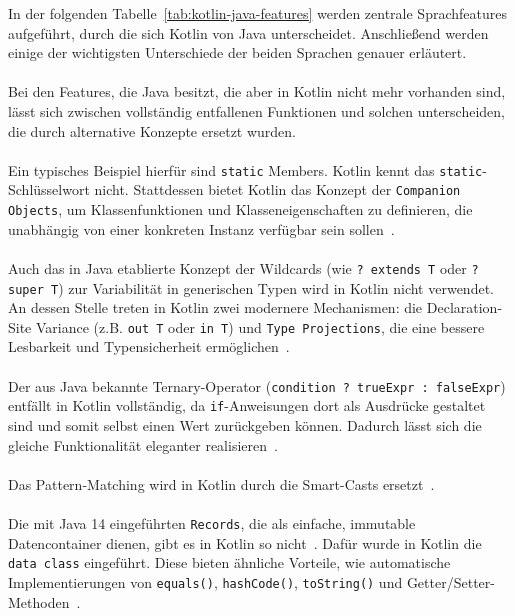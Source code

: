 \documentclass[11pt]{article}
\begin{document}
    In der folgenden Tabelle~\ref{tab:kotlin-java-features} werden zentrale Sprachfeatures aufgeführt, durch die sich Kotlin von Java unterscheidet.
    Anschließend werden einige der wichtigsten Unterschiede der beiden Sprachen genauer erläutert.\\
    \\
    Bei den Features, die Java besitzt, die aber in Kotlin nicht mehr vorhanden sind, lässt sich zwischen vollständig entfallenen Funktionen und solchen unterscheiden, die durch alternative Konzepte ersetzt wurden.\\
    \\
    Ein typisches Beispiel hierfür sind \texttt{static} Members.
    Kotlin kennt das \texttt{static}-Schlüsselwort nicht.
    Stattdessen bietet Kotlin das Konzept der \texttt{Companion Objects}, um Klassenfunktionen und Klasseneigenschaften zu definieren, die unabhängig von einer konkreten Instanz verfügbar sein sollen~\cite{kotlin-static-members}.\\
    \\
    Auch das in Java etablierte Konzept der Wildcards (wie \texttt{? extends T} oder \texttt{? super T}) zur Variabilität in generischen Typen wird in Kotlin nicht verwendet.
    An dessen Stelle treten in Kotlin zwei modernere Mechanismen: die Declaration-Site Variance (z.B. \texttt{out T} oder \texttt{in T}) und \texttt{Type Projections}, die eine bessere Lesbarkeit und Typensicherheit ermöglichen~\cite{doc-comparison}.\\
    \\
    Der aus Java bekannte Ternary-Operator (\texttt{condition ? trueExpr : falseExpr}) entfällt in Kotlin vollständig, da \texttt{if}-Anweisungen dort als Ausdrücke gestaltet sind und somit selbst einen Wert zurückgeben können.
    Dadurch lässt sich die gleiche Funktionalität eleganter realisieren~\cite{doc-comparison}.\\
    \\
    Das Pattern-Matching wird in Kotlin durch die Smart-Casts ersetzt~\cite{doc-comparison}.\\
    \\
    Die mit Java 14 eingeführten \texttt{Records}, die als einfache, immutable Datencontainer dienen, gibt es in Kotlin so nicht~\cite{jdk-record}.
    Dafür wurde in Kotlin die \texttt{data class} eingeführt.
    Diese bieten ähnliche Vorteile, wie automatische Implementierungen von \texttt{equals()}, \texttt{hashCode()}, \texttt{toString()} und Getter/Setter-Methoden~\cite{kotlin-data-class}.\\
\end{document}
